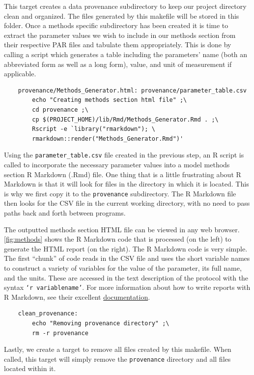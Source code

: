  This target creates a data provenance subdirectory to keep our project directory clean and organized. The files generated by this makefile will be stored in this folder.  Once a methods specific subdirectory has been created it is time to extract the parameter values we wish to include in our methods section from their respective PAR files and tabulate them appropriately. This is done by  calling a \bashn{} script which generates a table including the parameters' name (both an abbreviated form as well as a long form), value, and unit of measurement if applicable.

\begin{lstlisting}
	provenance/Methods_Generator.html: provenance/parameter_table.csv
		echo "Creating methods section html file" ;\
		cd provenance ;\
		cp $(PROJECT_HOME)/lib/Rmd/Methods_Generator.Rmd . ;\
		Rscript -e `library("rmarkdown"); \
		rmarkdown::render("Methods_Generator.Rmd")'
\end{lstlisting}

Using the \texttt{parameter_table.csv} file created in the previous step, an R script is called to incorporate the necessary parameter values into a model methods section R Markdown (.Rmd) file. One thing that is a little frustrating about R Markdown is that it will look for files in the directory in which it is located. This is why we first copy it to the \texttt{provenance} subdirectory. The R Markdown file then looks for the CSV file in the current working directory, with no need to pass paths back and forth between programs. 

The outputted methods section HTML file can be viewed in any web browser. \autoref{fig:methods} shows the R Markdown code that is processed (on the left) to generate the HTML report (on the right). The R Markdown code is very simple. The first ``chunk'' of code reads in the CSV file and uses the short variable names to construct a variety of variables for the value of the parameter, its full name, and the units. These are accessed in the text description of the protocol with the syntax \texttt{`r variablename'}. For more information about how to write reports with R Markdown, see their excellent \href{http://rmarkdown.rstudio.com}{documentation}. 

\begin{lstlisting}
	clean_provenance:
		echo "Removing provenance directory" ;\
		rm -r provenance
\end{lstlisting}

Lastly, we create a target to remove all files created by this makefile. When called, this target will simply remove the \texttt{provenance} directory and all files located within it.



